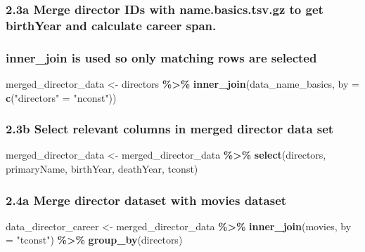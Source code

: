 \documentclass[
]{article}
\newenvironment{Shaded}{\begin{snugshade}}{\end{snugshade}}
\newcommand{\AttributeTok}[1]{\textcolor[rgb]{0.13,0.29,0.53}{#1}}
\newcommand{\FunctionTok}[1]{\textcolor[rgb]{0.13,0.29,0.53}{\textbf{#1}}}
\newcommand{\NormalTok}[1]{#1}
\newcommand{\OtherTok}[1]{\textcolor[rgb]{0.56,0.35,0.01}{#1}}
\newcommand{\SpecialCharTok}[1]{\textcolor[rgb]{0.81,0.36,0.00}{\textbf{#1}}}
\newcommand{\StringTok}[1]{\textcolor[rgb]{0.31,0.60,0.02}{#1}}
\begin{document}
\subsubsection{2.3a Merge director IDs with name.basics.tsv.gz to get
birthYear and calculate career
span.}\label{a-merge-director-ids-with-name.basics.tsv.gz-to-get-birthyear-and-calculate-career-span.}

\subsubsection{inner\_join is used so only matching rows are
selected}\label{inner_join-is-used-so-only-matching-rows-are-selected}

\begin{Shaded}
\begin{Highlighting}[]
\NormalTok{merged\_director\_data }\OtherTok{\textless{}{-}}\NormalTok{ directors }\SpecialCharTok{\%\textgreater{}\%}
  \FunctionTok{inner\_join}\NormalTok{(data\_name\_basics, }\AttributeTok{by =} \FunctionTok{c}\NormalTok{(}\StringTok{"directors"} \OtherTok{=} \StringTok{"nconst"}\NormalTok{))}
\end{Highlighting}
\end{Shaded}

\subsubsection{2.3b Select relevant columns in merged director data
set}\label{b-select-relevant-columns-in-merged-director-data-set}

\begin{Shaded}
\begin{Highlighting}[]
\NormalTok{merged\_director\_data }\OtherTok{\textless{}{-}}\NormalTok{ merged\_director\_data }\SpecialCharTok{\%\textgreater{}\%} 
  \FunctionTok{select}\NormalTok{(directors, primaryName, birthYear, deathYear, tconst)}
\end{Highlighting}
\end{Shaded}

\subsubsection{2.4a Merge director dataset with movies
dataset}\label{a-merge-director-dataset-with-movies-dataset}

\begin{Shaded}
\begin{Highlighting}[]
\NormalTok{data\_director\_career }\OtherTok{\textless{}{-}}\NormalTok{ merged\_director\_data }\SpecialCharTok{\%\textgreater{}\%}
  \FunctionTok{inner\_join}\NormalTok{(movies, }\AttributeTok{by =} \StringTok{"tconst"}\NormalTok{) }\SpecialCharTok{\%\textgreater{}\%}
  \FunctionTok{group\_by}\NormalTok{(directors)}
\end{Highlighting}
\end{Shaded}
\end{document}
